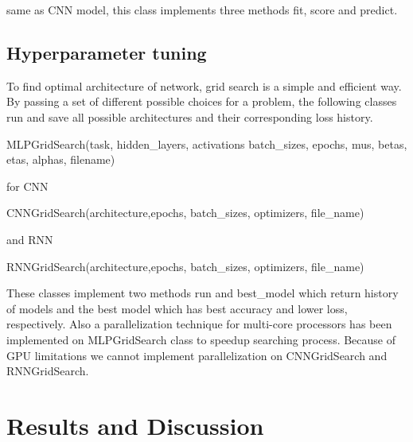 \documentclass[10pt]{SelfArx} %
\begin{document}
same as CNN model, this class implements three methods fit, score and predict.

\subsection{Hyperparameter tuning}
To find optimal architecture of network, grid search is a simple and efficient way. By passing a set of different possible choices for a problem, the following classes run and save all possible architectures and their corresponding loss history.
\begin{python}
MLPGridSearch(task, hidden_layers, 
      activations batch_sizes,
      epochs, mus, betas, etas,
      alphas, filename)
\end{python}
for CNN
\begin{python}
CNNGridSearch(architecture,epochs,
	  batch_sizes, optimizers,
	  file_name)
\end{python}
and RNN
\begin{python}
RNNGridSearch(architecture,epochs,
batch_sizes, optimizers,
file_name)
\end{python}

These classes implement two methods run and best\_model which return history of models and the best model which has best accuracy and lower loss, respectively. Also a parallelization technique for multi-core processors has been implemented on MLPGridSearch class to speedup searching process. Because of GPU limitations we cannot implement parallelization on CNNGridSearch and RNNGridSearch.

\section{Results and Discussion}
\end{document}

